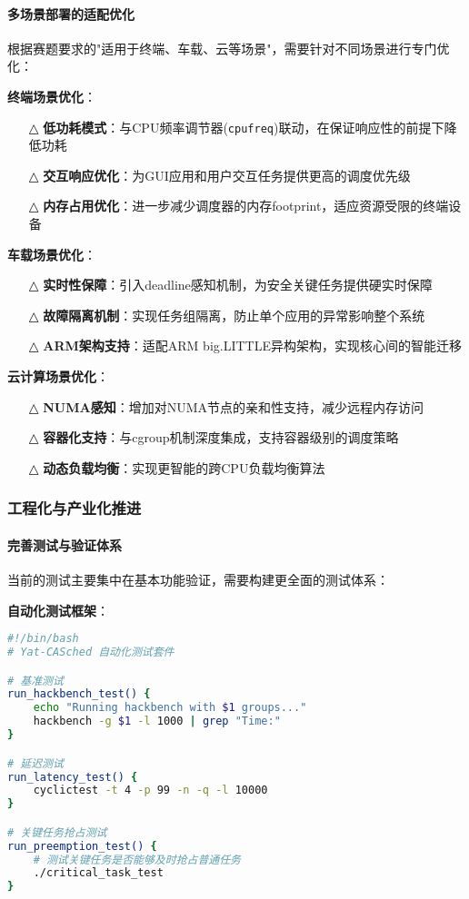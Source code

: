 \paragraph{多场景部署的适配优化}

根据赛题要求的"适用于终端、车载、云等场景"，需要针对不同场景进行专门优化：

\textbf{终端场景优化}：
\begin{itemize}
    \item[△] \textbf{低功耗模式}：与CPU频率调节器(\texttt{cpufreq})联动，在保证响应性的前提下降低功耗
    \item[△] \textbf{交互响应优化}：为GUI应用和用户交互任务提供更高的调度优先级
    \item[△] \textbf{内存占用优化}：进一步减少调度器的内存footprint，适应资源受限的终端设备
\end{itemize}

\textbf{车载场景优化}：
\begin{itemize}
    \item[△] \textbf{实时性保障}：引入deadline感知机制，为安全关键任务提供硬实时保障
    \item[△] \textbf{故障隔离机制}：实现任务组隔离，防止单个应用的异常影响整个系统
    \item[△] \textbf{ARM架构支持}：适配ARM big.LITTLE异构架构，实现核心间的智能迁移
\end{itemize}

\textbf{云计算场景优化}：
\begin{itemize}
    \item[△] \textbf{NUMA感知}：增加对NUMA节点的亲和性支持，减少远程内存访问
    \item[△] \textbf{容器化支持}：与cgroup机制深度集成，支持容器级别的调度策略
    \item[△] \textbf{动态负载均衡}：实现更智能的跨CPU负载均衡算法
\end{itemize}

\subsubsection{工程化与产业化推进}

\paragraph{完善测试与验证体系}

当前的测试主要集中在基本功能验证，需要构建更全面的测试体系：

\textbf{自动化测试框架}：
\begin{lstlisting}[language=bash, basicstyle=\small\ttfamily, caption={自动化测试脚本框架}]
#!/bin/bash
# Yat-CASched 自动化测试套件

# 基准测试
run_hackbench_test() {
    echo "Running hackbench with $1 groups..."
    hackbench -g $1 -l 1000 | grep "Time:"
}

# 延迟测试  
run_latency_test() {
    cyclictest -t 4 -p 99 -n -q -l 10000
}

# 关键任务抢占测试
run_preemption_test() {
    # 测试关键任务是否能够及时抢占普通任务
    ./critical_task_test
}
\end{lstlisting}

